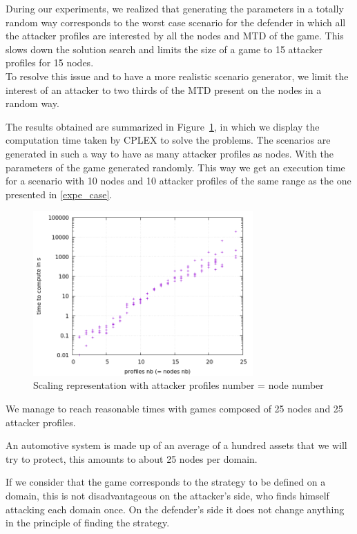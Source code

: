 During our experiments, we realized that generating the parameters in a totally random way corresponds to the worst case scenario for the defender in which all the attacker profiles are interested by all the nodes and MTD of the game. This slows down the solution search and limits the size of a game to 15 attacker profiles for 15 nodes. \\

To resolve this issue and to have a more realistic scenario generator, we limit the interest of an attacker to two thirds of the MTD present on the nodes in a random way. 

The results obtained are summarized in Figure~\ref{fig:game_pres}, in which we display the computation time taken by CPLEX to solve the problems. The scenarios are generated in such a way to have as many attacker profiles as nodes. With the parameters of the game generated randomly. This way we get an execution time for a scenario with 10 nodes and 10 attacker profiles of the same range as the one presented in \ref{expe_case}.

\begin{figure}[h]
    \centering
    \includegraphics[width=0.75\textwidth]{schema/plot_control_log.png}
    \caption{Scaling representation with attacker profiles number = node number}
    \label{fig:game_pres}
\end{figure}


We manage to reach reasonable times with games composed of 25 nodes and 25 attacker profiles.

An automotive system is made up of an average of a hundred assets that we will try to protect, this amounts to about 25 nodes per domain.

If we consider that the game corresponds to the strategy to be defined on a domain, this is not disadvantageous on the attacker's side, who finds himself attacking each domain once. On the defender's side it does not change anything in the principle of finding the strategy.

